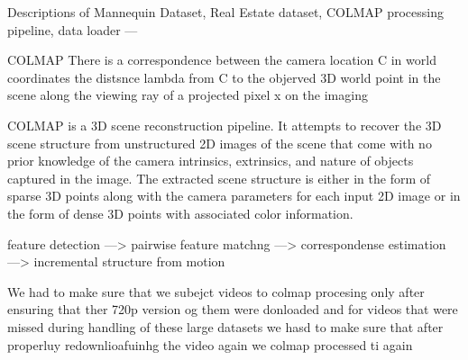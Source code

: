 Descriptions of Mannequin Dataset, Real Estate dataset, COLMAP processing pipeline, data loader ---

COLMAP
There is a correspondence between the camera location C in world coordinates the distsnce lambda from C to the objerved 3D world point in the scene along the viewing ray of a projected pixel x on the imaging 

COLMAP is a 3D scene reconstruction pipeline. It attempts to recover the 3D scene structure from unstructured 2D images of the scene that come with no prior knowledge of the camera intrinsics, extrinsics, and nature of objects captured in the image. 
The extracted scene structure is either in the form of sparse 3D points along with the camera parameters for each input 2D image or in the form of dense 3D points with associated color information.

feature detection ---> pairwise feature matchng ---> correspondense estimation ---> incremental structure from motion

We had to make sure that we subejct videos to colmap procesing only after ensuring that ther 720p version og them were donloaded and for videos that were missed during handling of these large datasets we hasd to make sure that after properluy redownlioafuinhg the video again we colmap processed ti again 




